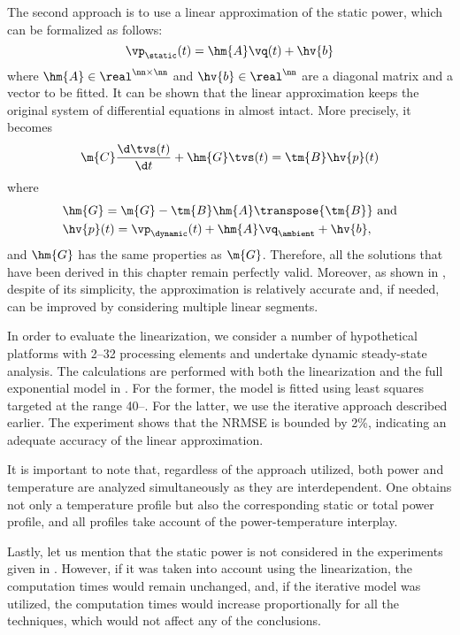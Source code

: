 The second approach is to use a linear approximation of the static power, which
can be formalized as follows:
\[
  \vp_\static(t) = \hm{A} \vq(t) + \hv{b}
\]
where $\hm{A} \in \real^{\nn \times \nn}$ and $\hv{b} \in \real^\nn$ are a
diagonal matrix and a vector to be fitted. It can be shown that the linear
approximation keeps the original system of differential equations in
 almost intact. More precisely, it
becomes
\[
  \m{C} \frac{\d \tvs(t)}{\d t} + \hm{G} \tvs(t) = \tm{B} \hv{p}(t)
\]
where
\begin{align*}
  & \hm{G} = \m{G} - \tm{B} \hm{A} \transpose{\tm{B}} \text{ and} \\
  & \hv{p}(t) = \vp_\dynamic(t) + \hm{A} \vq_\ambient + \hv{b},
\end{align*}
and $\hm{G}$ has the same properties as $\m{G}$. Therefore, all the solutions
that have been derived in this chapter remain perfectly valid. Moreover, as
shown in \cite{liu2007}, despite of its simplicity, the approximation is
relatively accurate and, if needed, can be improved by considering multiple
linear segments.

In order to evaluate the linearization, we consider a number of hypothetical
platforms with 2--32 processing elements and undertake dynamic steady-state
analysis. The calculations are performed with both the linearization and the
full exponential model in . For the former, the model is
fitted using least squares \cite{press2007} targeted at the range
40--. For the latter, we use the iterative approach described
earlier. The experiment shows that the \ac{NRMSE} is bounded by 2\%, indicating
an adequate accuracy of the linear approximation.

It is important to note that, regardless of the approach utilized, both power
and temperature are analyzed simultaneously as they are interdependent. One
obtains not only a temperature profile but also the corresponding static or
total power profile, and all profiles take account of the power-temperature
interplay.

Lastly, let us mention that the static power is not considered in the
experiments given in . However, if it was taken
into account using the linearization, the computation times would remain
unchanged, and, if the iterative model was utilized, the computation times would
increase proportionally for all the techniques, which would not affect any of
the conclusions.
